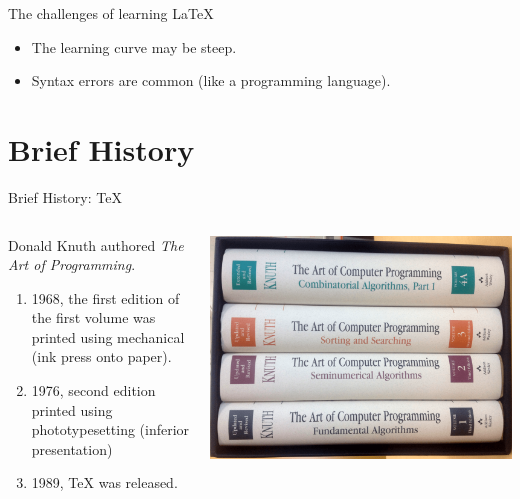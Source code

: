 \documentclass[english,aspectratio=169,14pt]{beamer}
\begin{document}
\begin{frame}{The challenges of learning \LaTeX}
    \begin{itemize}
        \item The learning curve may be steep.
        \item Syntax errors are common (like a programming language).
    \end{itemize}
\end{frame}

\section{Brief History}

\begin{frame}{Brief History: \TeX}
    \begin{columns}[T] %
    \begin{column}{9cm} %
    Donald Knuth authored \emph{The Art of Programming}.
    \begin{enumerate}
        \item 1968, the first edition of the first volume was printed using mechanical (ink press onto paper).
        \item 1976, second edition printed using phototypesetting (inferior presentation)
        \item 1989, \TeX{} was released.
    \end{enumerate}
     
    \end{column}
    \begin{column}{5cm} %
    
        \includegraphics[width=\textwidth]{images/TheArtOfProgrammingBoxSet}
    \end{column}
    \end{columns}
\end{frame}
\end{document}
